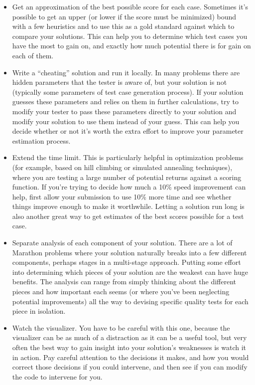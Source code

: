 \begin{itemize}
\item
  Get an approximation of the best possible score for each case.
  Sometimes it's possible to get an upper (or lower if the score must be
  minimized) bound with a few heuristics and to use this as a gold
  standard against which to compare your solutions. This can help you to
  determine which test cases you have the most to gain on, and exactly
  how much potential there is for gain on each of them.
\item
  Write a ``cheating'' solution and run it locally. In many problems
  there are hidden parameters that the tester is aware of, but your
  solution is not (typically some parameters of test case generation
  process). If your solution guesses these parameters and relies on them
  in further calculations, try to modify your tester to pass these
  parameters directly to your solution and modify your solution to use
  them instead of your guess. This can help you decide whether or not
  it's worth the extra effort to improve your parameter estimation
  process.
\item
  Extend the time limit. This is particularly helpful in optimization
  problems (for example, based on hill climbing or simulated annealing
  techniques), where you are testing a large number of potential returns
  against a scoring function. If you're trying to decide how much a 10\%
  speed improvement can help, first allow your submission to use 10\%
  more time and see whether things improve enough to make it worthwhile.
  Letting a solution run long is also another great way to get estimates
  of the best scores possible for a test case.
\item
  Separate analysis of each component of your solution. There are a lot
  of Marathon problems where your solution naturally breaks into a few
  different components, perhaps stages in a multi-stage approach.
  Putting some effort into determining which pieces of your solution are
  the weakest can have huge benefits. The analysis can range from simply
  thinking about the different pieces and how important each seems (or
  where you've been neglecting potential improvements) all the way to
  devising specific quality tests for each piece in isolation.
\item
  Watch the visualizer. You have to be careful with this one, because
  the visualizer can be as much of a distraction as it can be a useful
  tool, but very often the best way to gain insight into your solution's
  weaknesses is watch it in action. Pay careful attention to the
  decisions it makes, and how you would correct those decisions if you
  could intervene, and then see if you can modify the code to intervene
  for you.
\end{itemize}

